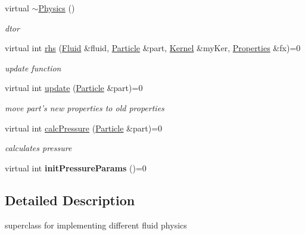 \begin{DoxyCompactItemize}
\item 
\hypertarget{classPhysics_afdd87b5bb9fe2e927c37d50fbeb8216b}{virtual \hyperlink{classPhysics_afdd87b5bb9fe2e927c37d50fbeb8216b}{$\sim$\-Physics} ()}\label{classPhysics_afdd87b5bb9fe2e927c37d50fbeb8216b}

\begin{DoxyCompactList}\small\item\em dtor \end{DoxyCompactList}\item 
virtual int \hyperlink{classPhysics_a0fd5afe65228da08e3886e58d5285d43}{rhs} (\hyperlink{classFluid}{\-Fluid} \&fluid, \hyperlink{classParticle}{\-Particle} \&part, \hyperlink{classKernel}{\-Kernel} \&my\-Ker, \hyperlink{structProperties}{\-Properties} \&fx)=0
\begin{DoxyCompactList}\small\item\em update function \end{DoxyCompactList}\item 
\hypertarget{classPhysics_ab51a11d51e09b132610cd6fbb95d0c0c}{virtual int \hyperlink{classPhysics_ab51a11d51e09b132610cd6fbb95d0c0c}{update} (\hyperlink{classParticle}{\-Particle} \&part)=0}\label{classPhysics_ab51a11d51e09b132610cd6fbb95d0c0c}

\begin{DoxyCompactList}\small\item\em move part's new properties to old properties \end{DoxyCompactList}\item 
\hypertarget{classPhysics_a50759e0407dff12021c94f9fa6729765}{virtual int \hyperlink{classPhysics_a50759e0407dff12021c94f9fa6729765}{calc\-Pressure} (\hyperlink{classParticle}{\-Particle} \&part)=0}\label{classPhysics_a50759e0407dff12021c94f9fa6729765}

\begin{DoxyCompactList}\small\item\em calculates pressure \end{DoxyCompactList}\item 
\hypertarget{classPhysics_a933c3288d21bd8dbdab422d4fe09f84d}{virtual int {\bfseries init\-Pressure\-Params} ()=0}\label{classPhysics_a933c3288d21bd8dbdab422d4fe09f84d}

\end{DoxyCompactItemize}


\subsection{\-Detailed \-Description}
superclass for implementing different fluid physics 

